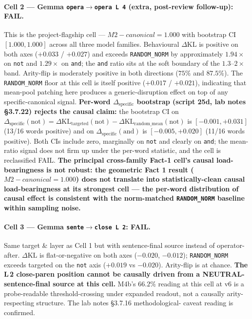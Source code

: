 \documentclass[11pt,letterpaper]{article}
\newcommand{\dkl}{\ensuremath{\Delta\mathrm{KL}}}
\newcommand{\dspec}{\ensuremath{\Delta_{\text{specific}}}}
\newcommand{\Mc}{M2-canonical}
\newcommand{\Mbfb}{M4b}
\begin{document}
\paragraph{Cell 2 --- Gemma \texttt{opera$\to$opera L\,4} (extra,
post-review follow-up): FAIL.} This is the project-flagship
cell --- $\Mc = 1.000$ with bootstrap CI $[1.000, 1.000]$ across all
three model families. Behavioural \dkl{} is positive on both axes
($+0.033$ / $+0.027$) and exceeds \texttt{RANDOM\_NORM} by
approximately $1.94\times$ on \texttt{not} and $1.29\times$ on
\texttt{and}; the \texttt{and} ratio sits at the soft boundary of
the $1.3$--$2\times$ band. Arity-flip is moderately positive in both
directions ($75\%$ and $87.5\%$). The \texttt{RANDOM\_NORM} floor at
this cell is itself positive ($+0.017$ / $+0.021$), indicating that
mean-pool patching here produces a generic-disruption effect on top
of any specific-canonical signal. \textbf{Per-word \dspec{} bootstrap
(script 25d, lab notes \S3.7.22) rejects the causal claim:} the
bootstrap CI on
$\dspec(\text{not}) = \dkl_{\text{targeted}}(\text{not}) -
\dkl_{\text{random\_mean}}(\text{not})$ is $[-0.001, +0.031]$
(13/16 words positive) and on $\dspec(\text{and})$ is
$[-0.005, +0.020]$ (11/16 words positive). Both CIs include zero,
marginally on \texttt{not} and clearly on \texttt{and}; the
mean-ratio signal does not firm up under the per-word statistic, and
the cell is reclassified FAIL.   \textbf{The principal cross-family
Fact-1 cell's causal load-bearingness is not robust: the geometric
Fact 1 result ($\Mc = 1.000$) does not translate into
statistically-clean causal load-bearingness at its strongest cell ---
the per-word distribution of causal effect is consistent with the
norm-matched \texttt{RANDOM\_NORM} baseline within sampling noise.}

\paragraph{Cell 3 --- Gemma \texttt{sente$\to$close L\,2}: FAIL.}
Same target \& layer as Cell 1 but with sentence-final source
instead of operator-after. \dkl{} is flat-or-negative on both axes
($-0.020$, $-0.012$); \texttt{RANDOM\_NORM} exceeds targeted on the
\texttt{not} axis ($+0.019$ vs $-0.020$). Arity-flip is at chance.
\textbf{The L\,2 close-paren position cannot be causally driven
from a NEUTRAL-sentence-final source at this cell.} \Mbfb{}'s
$66.2\%$ reading at this cell at v6 is a probe-readable
threshold-crossing under expanded readout, not a causally
arity-respecting structure. The lab notes \S3.7.16 methodological-
caveat reading is confirmed.
\end{document}
